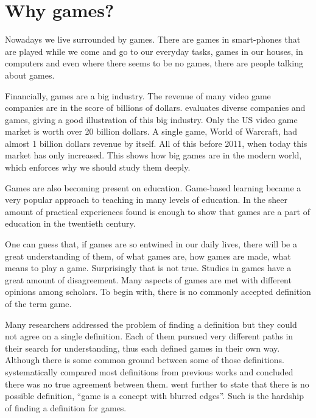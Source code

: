 \section{Why games?}

Nowadays we live surrounded by games. There are games in smart-phones that are played while we come and go to our everyday tasks, games in our houses, in computers and even where there seems to be no games, there are people talking about games.

Financially, games are a big industry. The revenue of many video game companies are in the score of billions of dollars. \citet{babb2013comparing} evaluates diverse companies and games, giving a good illustration of this big industry. Only the US video game market is worth over 20 billion dollars. A single game, World of Warcraft, had almost 1 billion dollars revenue by itself. All of this before 2011, when today this market has only increased. This shows how big games are in the modern world, which enforces why we should study them deeply.

Games are also becoming present on education. Game-based learning became a very popular approach to teaching in many levels of education. In \citet{hainey2016systematic} the sheer amount of practical experiences found is enough to show that games are a part of education in the twentieth century.

One can guess that, if games are so entwined in our daily lives, there will be a great understanding of them, of what games are, how games are made, what means to play a game. Surprisingly that is not true. Studies in games have a great amount of disagreement. Many aspects of games are met with different opinions among scholars. To begin with, there is no commonly accepted definition of the term game. 

Many researchers addressed the problem of finding a definition \citep{jarvinen2009games,salen2004rules,crawford1984art,schell2014art,juul2010game} but they could not agree on a single definition. Each of them pursued very different paths in their search for understanding, thus each defined games in their own way. Although there is some common ground between some of those definitions. \cite{salen2004rules} systematically compared most definitions from previous works and concluded there was no true agreement between them. \cite{wittgenstein_philosophical_2009} went further to state that there is no possible definition, ``game is a concept with blurred edges''. Such is the hardship of finding a definition for games.

